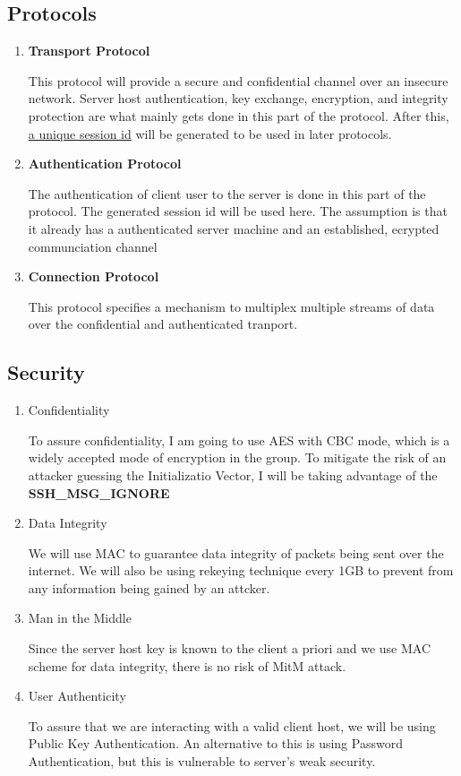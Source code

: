 \documentclass[10pt,sigconf]{acmart}
\begin{document}

\subsection{Protocols}

\begin{enumerate}
    \item \textbf{Transport Protocol}
    
    This protocol will provide a secure and confidential channel over an insecure network. Server host authentication, key exchange, encryption, and integrity protection are what mainly gets done in this part of the protocol. After this, \underline{a unique session id} will be generated to be used in later protocols. 
    \item \textbf{Authentication Protocol}
    
    The authentication of client user to the server is done in this part of the protocol. The generated session id will be used here. The assumption is that it already has a authenticated server machine and an established, ecrypted communciation channel
    \item \textbf{Connection Protocol}
    
    This protocol specifies a mechanism to multiplex multiple streams of data over the confidential and authenticated tranport.
\end{enumerate}

\subsection{Security}
\begin{enumerate}
    \item Confidentiality
    
    To assure confidentiality, I am going to use AES with CBC mode, which is a widely accepted mode of encryption in the group. To mitigate the risk of an attacker guessing the Initializatio Vector, I will be taking advantage of the \textbf{SSH\_MSG\_IGNORE}
    \item Data Integrity
    
    We will use MAC to guarantee data integrity of packets being sent over the internet. We will also be using rekeying technique every 1GB to prevent from any information being gained by an attcker.

    \item Man in the Middle
    
    Since the server host key is known to the client a priori and we use MAC scheme for data integrity, there is no risk of MitM attack.

    \item User Authenticity
    
    To assure that we are interacting with a valid client host, we will be using Public Key Authentication. An alternative to this is using Password Authentication, but this is vulnerable to server's weak security.
\end{enumerate}
\end{document}
